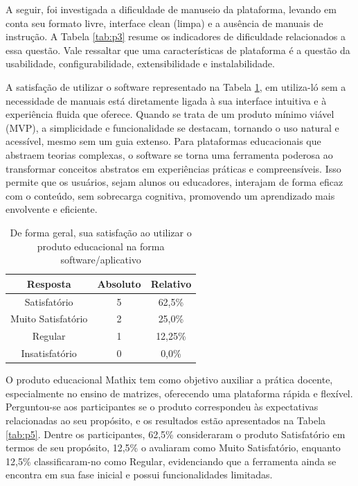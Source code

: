 
A seguir, foi investigada a dificuldade de manuseio da plataforma, levando em conta seu formato livre, interface clean (limpa) e a ausência de manuais de instrução. A Tabela \ref{tab:p3} resume os indicadores de dificuldade relacionados a essa questão. Vale ressaltar que uma características de plataforma é a questão da usabilidade, configurabilidade, extensibilidade e instalabilidade.


A satisfação de utilizar o software representado na Tabela \ref{tab:p4}, em utiliza-ló sem a necessidade de manuais está diretamente ligada à sua interface intuitiva e à experiência fluida que oferece. Quando se trata de um produto mínimo viável (MVP), a simplicidade e funcionalidade se destacam, tornando o uso natural e acessível, mesmo sem um guia extenso. Para plataformas educacionais que abstraem teorias complexas, o software se torna uma ferramenta poderosa ao transformar conceitos abstratos em experiências práticas e compreensíveis. Isso permite que os usuários, sejam alunos ou educadores, interajam de forma eficaz com o conteúdo, sem sobrecarga cognitiva, promovendo um aprendizado mais envolvente e eficiente.


\begin{table}[h!]
    \centering
    \caption{De forma geral, sua satisfação ao utilizar o produto educacional na forma software/aplicativo}
    \begin{tabular}{c|c|c}
        \textbf{Resposta} &	\textbf{Absoluto} & \textbf{Relativo} \\
        \hline
        Satisfatório & 5 & 62,5\% \\
        \hline
        Muito Satisfatório & 2 & 25,0\% \\
        \hline
        Regular & 1 & 12,25\% \\
        \hline
        Insatisfatório & 0 & 0,0\% \\
    \end{tabular}
    \label{tab:p4}
\end{table}



O produto educacional Mathix tem como objetivo auxiliar a prática docente, especialmente no ensino de matrizes, oferecendo uma plataforma rápida e flexível. Perguntou-se aos participantes se o produto correspondeu às expectativas relacionadas ao seu propósito, e os resultados estão apresentados na Tabela \ref{tab:p5}. Dentre os participantes, 62,5\% consideraram o produto Satisfatório em termos de seu propósito, 12,5\% o avaliaram como Muito Satisfatório, enquanto 12,5\% classificaram-no como Regular, evidenciando que a ferramenta ainda se encontra em sua fase inicial e possui funcionalidades limitadas.


